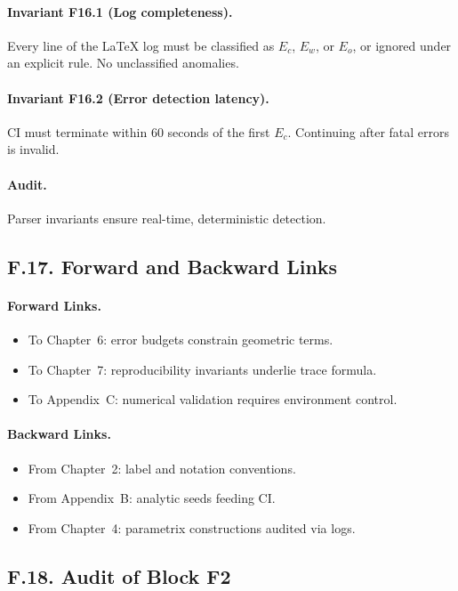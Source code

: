\paragraph{Invariant F16.1 (Log completeness).}
Every line of the LaTeX log must be classified as $E_c$, $E_w$, or
$E_o$, or ignored under an explicit rule. No unclassified anomalies.

\paragraph{Invariant F16.2 (Error detection latency).}
CI must terminate within 60 seconds of the first $E_c$. Continuing after
fatal errors is invalid.

\paragraph{Audit.}
Parser invariants ensure real-time, deterministic detection.

\subsection*{F.17. Forward and Backward Links}

\paragraph{Forward Links.}
\begin{itemize}
  \item To Chapter~6: error budgets constrain geometric terms.
  \item To Chapter~7: reproducibility invariants underlie trace formula.
  \item To Appendix~C: numerical validation requires environment control.
\end{itemize}

\paragraph{Backward Links.}
\begin{itemize}
  \item From Chapter~2: label and notation conventions.
  \item From Appendix~B: analytic seeds feeding CI.
  \item From Chapter~4: parametrix constructions audited via logs.
\end{itemize}

\subsection*{F.18. Audit of Block F2}

